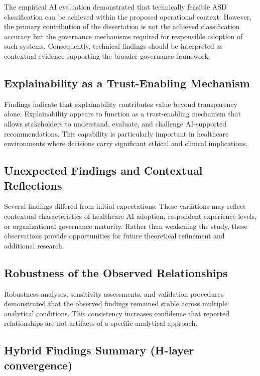 \noindent The empirical AI evaluation demonstrated that technically feasible ASD classification can be achieved within the proposed operational context. However, the primary contribution of the dissertation is not the achieved classification accuracy but the governance mechanisms required for responsible adoption of such systems. Consequently, technical findings should be interpreted as contextual evidence supporting the broader governance framework.


\subsection{Explainability as a Trust-Enabling Mechanism}
\label{sec:explainability_trust_enabling}

\noindent Findings indicate that explainability contributes value beyond transparency alone. Explainability appears to function as a trust-enabling mechanism that allows stakeholders to understand, evaluate, and challenge AI-supported recommendations. This capability is particularly important in healthcare environments where decisions carry significant ethical and clinical implications.


\subsection{Unexpected Findings and Contextual Reflections}
\label{sec:unexpected_findings}

\noindent Several findings differed from initial expectations. These variations may reflect contextual characteristics of healthcare AI adoption, respondent experience levels, or organizational governance maturity. Rather than weakening the study, these observations provide opportunities for future theoretical refinement and additional research.


\subsection{Robustness of the Observed Relationships}
\label{sec:robustness_statement}

\noindent Robustness analyses, sensitivity assessments, and validation procedures demonstrated that the observed findings remained stable across multiple analytical conditions. This consistency increases confidence that reported relationships are not artifacts of a specific analytical approach.

\subsection{Hybrid Findings Summary (H-layer convergence)}
\label{sec:ch4_hybrid_findings_summary}

